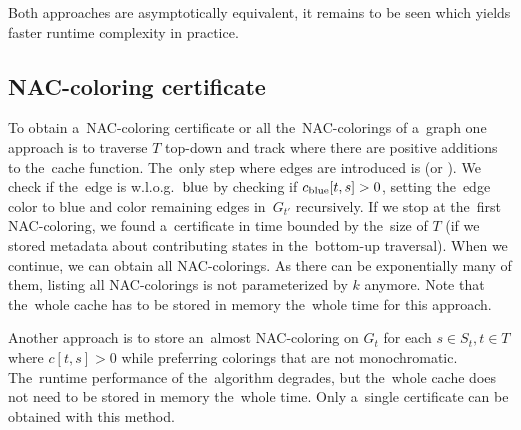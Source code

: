 Both approaches are asymptotically equivalent,
it remains to be seen which yields faster runtime complexity in practice.



\subsection{NAC-coloring certificate}

To obtain a~NAC-coloring certificate or all the~NAC-colorings of a~graph
one approach is to traverse \( T \) top-down
and track where there are positive additions to the~cache function.
%
The~only step where edges are introduced is \IntroduceEdgeNode{}
(or \IntroduceVertexWithEdgesNode{}).
We check if the~edge is w.l.o.g.\ \( \text{blue} \) by checking if \( c_{\text{blue}}[t,s] > 0 \),
setting the~edge color to blue and color remaining edges in~\( G_{t'} \) recursively.
If we stop at the~first NAC-coloring, we found a~certificate in time bounded by
the~size of \( T \)
(if we stored metadata about contributing states in the~bottom-up traversal).
%
When we continue, we can obtain all NAC-colorings.
As there can be exponentially many of them,
listing all NAC-colorings is not parameterized by \( k \) anymore.
Note that the~whole cache has to be stored in memory
the~whole time for this approach.

Another approach is to store an~almost NAC-coloring on \( G_t \)
for each \( s \in S_t, t \in T \) where \( c[t, s] > 0 \)
while preferring colorings that are not monochromatic.
The~runtime performance of the~algorithm degrades,
but the~whole cache does not need to be stored in memory the~whole time.
Only a~single certificate can be obtained with this method.


%

